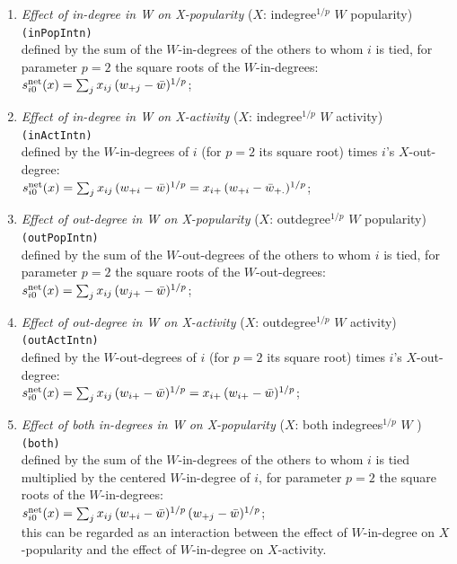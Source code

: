 \documentclass[a4paper,fleqn,11pt]{article}
\newcommand{\+}{\, + \,}
\newcommand{\vit}{\theenumi}
\newcounter{savenumi}
\begin{document}
\begin{enumerate}
\setcounter{enumi}{\value{savenumi}}
 \item {\em Effect of in-degree in W on X-popularity } ($X$: indegree$^{1/p}$ $W$ popularity)   \texttt{(inPopIntn)}\\
 defined by   the sum of  the $W$-in-degrees of the others to whom $i$ is tied,
 for parameter $p = 2$ the square roots of the $W$-in-degrees:\\
 $s^{\rm net}_{i\vit}(x) =  \sum_j x_{ij}\, (w_{+j} - \bar w)^{1/p}  $;\\

 \item {\em Effect of in-degree in W on X-activity } ($X$: indegree$^{1/p}$ $W$ activity)  \texttt{(inActIntn)}\\
 defined by the $W$-in-degrees of $i$ (for $p = 2$ its square root)
 times $i$'s $X$-out-degree:\\
 $s^{\rm net}_{i\vit}(x) =  \sum_j x_{ij}\, (w_{+i} - \bar w)^{1/p}
                 =  x_{i+}\, (w_{+i} - \bar w_{+.}) ^{1/p} $;\\

 \item {\em Effect of out-degree in W on X-popularity } ($X$: outdegree$^{1/p}$ $W$ popularity) \texttt{(outPopIntn)}\\
 defined by   the sum of  the $W$-out-degrees of the others to whom $i$ is tied,
 for parameter $p = 2$ the square roots of the $W$-out-degrees:\\
 $s^{\rm net}_{i\vit}(x) =  \sum_j x_{ij}\, (w_{j+} - \bar w)^{1/p}  $;\\

 \item {\em Effect of out-degree  in W on X-activity } ($X$: outdegree$^{1/p}$ $W$ activity) \texttt{(outActIntn)}\\
 defined by the $W$-out-degrees of $i$ (for $p = 2$ its square root)
 times $i$'s $X$-out-degree:\\
 $s^{\rm net}_{i\vit}(x) =  \sum_j x_{ij}\, (w_{i+} - \bar w)^{1/p} =
                           x_{i+}\, (w_{i+} - \bar w)^{1/p} $;\\

 \item {\em Effect of both in-degrees in W on X-popularity } ($X$: both indegrees$^{1/p}$ $W$ ) \texttt{(both)}\\
 defined by   the sum of  the $W$-in-degrees of the others to whom $i$ is tied
 multiplied by the centered $W$-in-degree of $i$,
 for parameter $p = 2$ the square roots of the $W$-in-degrees:\\
 $s^{\rm net}_{i\vit}(x) =  \sum_j x_{ij}\, (w_{+i} - \bar w)^{1/p} \, (w_{+j} - \bar w)^{1/p}  $;\\
 this can be regarded as an interaction between the effect of $W$-in-degree on $X$-popularity
 and the effect of $W$-in-degree on $X$-activity.
\setcounter{savenumi}{\value{enumi}}
\end{enumerate}
\end{document}
